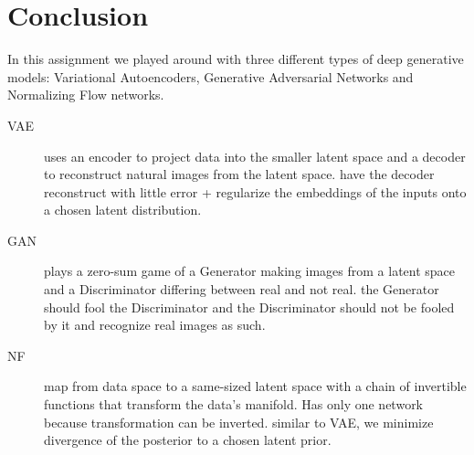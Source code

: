 \documentclass{article}
\begin{document}
\section{Conclusion}
In this assignment we played around with three different types of deep generative models: Variational Autoencoders, Generative Adversarial Networks and Normalizing Flow networks.

\begin{description}
  \item[VAE] uses an encoder to project data into the smaller latent space and a decoder to reconstruct natural images from the latent space.  have the decoder reconstruct with little error + regularize the embeddings of the inputs onto a chosen latent distribution.
  \item[GAN] plays a zero-sum game of a Generator making images from a latent space and a Discriminator differing between real and not real.  the Generator should fool the Discriminator and the Discriminator should not be fooled by it and recognize real images as such.
  \item[NF] map from data space to a same-sized latent space with a chain of invertible functions that transform the data's manifold. Has only one network because transformation can be inverted.  similar to VAE, we minimize divergence of the posterior to a chosen latent prior.
\end{description}



\end{document}
